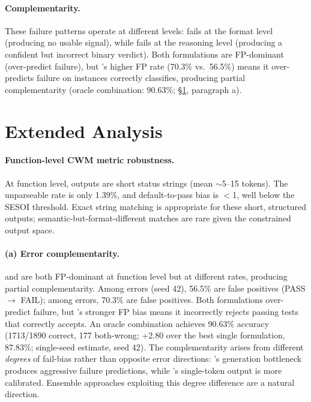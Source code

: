 \paragraph{Complementarity.}
These failure patterns operate at different levels: \cwm{} fails at the format level (producing no usable signal), while \cls{} fails at the reasoning level (producing a confident but incorrect binary verdict). Both formulations are FP-dominant (over-predict failure), but \cwm{}'s higher FP rate (70.3\% vs.\ 56.5\%) means it over-predicts failure on instances \cls{} correctly classifies, producing partial complementarity (oracle combination: 90.63\%; \S\ref{app:extended_analysis}, paragraph a).

\section{Extended Analysis}
\label{app:extended_analysis}

\paragraph{Function-level CWM metric robustness.}
At function level, \cwm{} outputs are short status strings (mean ${\sim}$5--15 tokens). The unparseable rate is only 1.39\%, and default-to-pass bias is $<$1\pp{}, well below the SESOI threshold. Exact string matching is appropriate for these short, structured outputs; semantic-but-format-different matches are rare given the constrained output space.

\paragraph{(a) Error complementarity.}
\cls{} and \cwm{} are both FP-dominant at function level but at different rates, producing partial complementarity. Among \cls{} errors (seed 42), 56.5\% are false positives (PASS $\to$ FAIL); among \cwm{} errors, 70.3\% are false positives. Both formulations over-predict failure, but \cwm{}'s stronger FP bias means it incorrectly rejects passing tests that \cls{} correctly accepts. An oracle combination achieves 90.63\% accuracy (1713/1890 correct, 177 both-wrong; +2.80\pp{} over the best single formulation, \cls{} 87.83\%; single-seed estimate, seed 42). The complementarity arises from different \emph{degrees} of fail-bias rather than opposite error directions: \cwm{}'s generation bottleneck produces aggressive failure predictions, while \cls{}'s single-token output is more calibrated. Ensemble approaches exploiting this degree difference are a natural direction.

